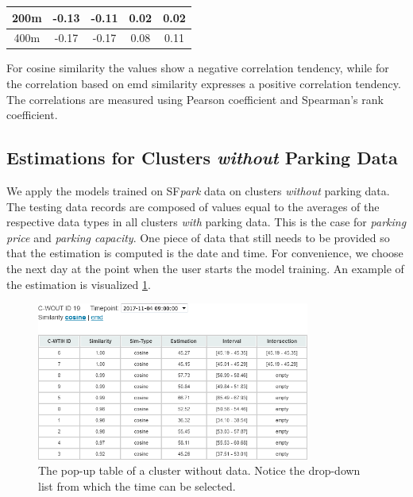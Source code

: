 \begin{table}[!ht]
{\begin{tabular}{ | c | c | c | c | c | }
			200m & -0.13 & -0.11 & 0.02 & 0.02 \\ \hline
			400m & -0.17 & -0.17 & 0.08 & 0.11 \\ \hline
		\end{tabular}}
		\label{tab:similarity_vs_estimation}
		\begin{tabnote}
			For cosine similarity the values show a negative correlation tendency, while for the correlation based on emd similarity expresses a positive correlation tendency. The correlations are measured using Pearson coefficient and Spearman's rank coefficient.
		\end{tabnote}
\end{table}	

\subsection{Estimations for Clusters \textit{without} Parking Data}
\label{evaluation:estimations_cwout}
We apply the models trained on SF\textit{park} data on clusters \textit{without} parking data.
The testing data records are composed of values equal to the averages of the respective data types in all clusters \textit{with} parking data.
This is the case for \textit{parking price} and \textit{parking capacity}.
One piece of data that still needs to be provided so that the estimation is computed is the date and time.
For convenience, we choose the next day at the point when the user starts the model training. 
An example of the estimation is visualized \cref{fig:cwout_table}.

\begin{figure}[!ht]
	\centering
	\includegraphics[width=0.8\textwidth]{graphics/cwout_cosine_table.png}
	\caption{The pop-up table of a cluster without data.
		Notice the drop-down list from which the time can be selected.}
	\label{fig:cwout_table}
\end{figure}

